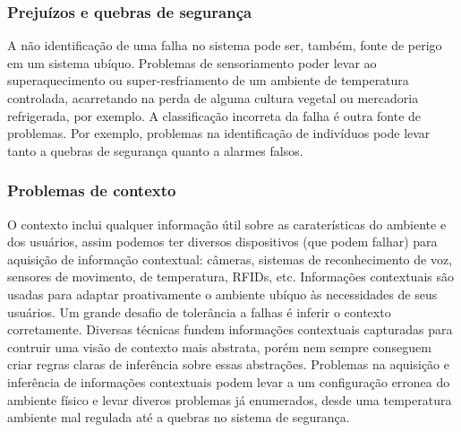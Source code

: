 \subsubsection*{Prejuízos e quebras de segurança}

A não identificação de uma falha no sistema pode ser, também, fonte de perigo em um sistema ubíquo. Problemas de sensoriamento poder levar ao superaquecimento ou super-resfriamento de um ambiente de temperatura controlada, acarretando na perda de alguma cultura vegetal ou mercadoria refrigerada, por exemplo. A classificação incorreta da falha é outra fonte de problemas. Por exemplo, problemas na identificação de indivíduos pode levar tanto a quebras de segurança quanto a alarmes falsos.

\subsubsection*{Problemas de contexto}

O contexto inclui qualquer informação útil sobre as caraterísticas do ambiente e dos usuários, assim podemos ter diversos dispositivos (que podem falhar) para aquisição de informação contextual: câmeras, sistemas de reconhecimento de voz, sensores de movimento, de temperatura, RFIDs, etc. Informações contextuais são usadas para adaptar proativamente o ambiente ubíquo às necessidades de seus usuários. Um grande desafio de tolerância a falhas é inferir o contexto corretamente. Diversas técnicas fundem informações contextuais capturadas para contruir uma visão de contexto mais abstrata, porém nem sempre conseguem criar regras claras de inferência sobre essas abstrações. Problemas na aquisição e inferência de informações contextuais podem levar a um configuração erronea do ambiente físico e levar diveros problemas já enumerados, desde uma temperatura ambiente mal regulada até a quebras no sistema de segurança.




